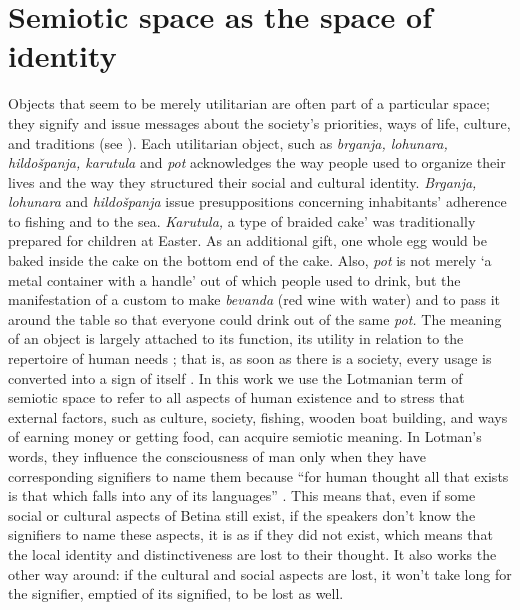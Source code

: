 \documentclass[output=paper]{LSP/langsci}
\begin{document}
\section{ Semiotic space as the space of identity}
Objects that seem to be merely utilitarian are often part of a particular space; they signify and issue messages about the society’s priorities, ways of life, culture, and traditions (see \citealt[110]{hawkes_structuralism_2004}). Each utilitarian object, such as \textit{brganja, lohunara, hildošpanja, karutula }and \textit{pot }acknowledges the way people used to organize their lives and the way they structured their social and cultural identity. \textit{Brganja, lohunara }and\textit{ hildošpanja }issue presuppositions concerning inhabitants’ adherence to fishing and to the sea.\textit{ Karutula,} a type of braided cake’ was traditionally prepared for children at Easter. As an additional gift, one whole egg would be baked inside the cake on the bottom end of the cake. Also, \textit{pot }is not merely ‘a metal container with a handle’ out of which people used to drink, but the manifestation of a custom to make \textit{bevanda }(red wine with water) and to pass it around the table so that everyone could drink out of the same \textit{pot. }The meaning of an object is largely attached to its function, its utility in relation to the repertoire of human needs \citep[48]{moles_theorie_1972}; that is, as soon as there is a society, every usage is converted into a sign of itself \citep[41]{barthes_elements_1968}. In this work we use the Lotmanian term of semiotic space to refer to all aspects of human existence and to stress that external factors, such as culture, society, fishing, wooden boat building, and ways of earning money or getting food, can acquire semiotic meaning. In Lotman’s words, they influence the consciousness of man only when they have corresponding signifiers to name them because “for human thought all that exists is that which falls into any of its languages” \citep[134]{lotman_culture_2009}. This means that, even if some social or cultural aspects of Betina still exist, if the speakers don’t know the signifiers to name these aspects, it is as if they did not exist, which means that the local identity and distinctiveness are lost to their thought. It also works the other way around: if the cultural and social aspects are lost, it won’t take long for the signifier, emptied of its signified, to be lost as well.
\end{document}
